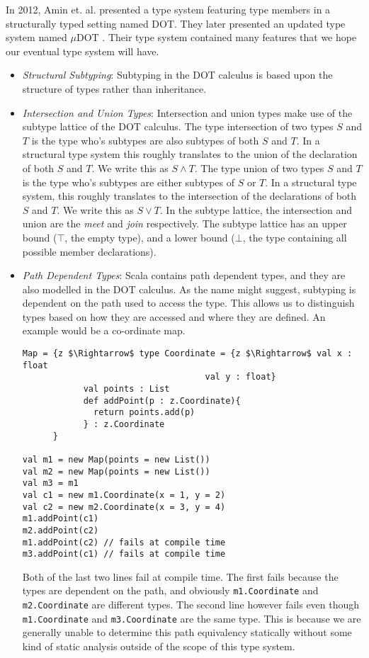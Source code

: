 \documentclass[11pt
              , a4paper
              , twoside
              , openright
              ]{report}
\numberwithin{case}{theorem}
\numberwithin{subcase}{case}
\begin{document}
In 2012, Amin et. al. \cite{amin:fool:2012} presented a type system featuring type members in a structurally typed setting named DOT. They later presented an updated type system named $\mu$DOT \cite{Amin:2014:FPT:2660193.2660216}. Their type system contained many features that we hope our eventual type system will have. 
\begin{itemize}
\item
\emph{Structural Subtyping}: Subtyping in the DOT calculus is based upon the structure of types rather than inheritance.
\item
\emph{Intersection and Union Types}: Intersection and union types \cite{Barbanera:1995:IUT:203538.203547, Pierce:1992:PIT:145640} make use of the subtype lattice of the DOT calculus. The type intersection of two types $S$ and $T$ is the type who's subtypes are also subtypes of both $S$ and $T$. In a structural type system this roughly translates to the union of the declaration of both $S$ and $T$. We write this as $S \wedge T$. The type union of two types $S$ and $T$ is the type who's subtypes are either subtypes of $S$ or $T$. In a structural type system, this roughly translates to the intersection of the declarations of both $S$ and $T$. We write this as $S \vee T$. In the subtype lattice, the intersection and union are the \emph{meet} and \emph{join} respectively. The subtype lattice has an upper bound ($\top$, the empty type), and a lower bound ($\bot$, the type containing all possible member declarations).
\item
\emph{Path Dependent Types}: Scala contains path dependent types, and they are also modelled in the DOT calculus. As the name might suggest, subtyping is dependent on the path used to access the type. This allows us to distinguish types based on how they are accessed and where they are defined. An example would be a co-ordinate map.
\begin{lstlisting}[mathescape, style=customlang]
Map = {z $\Rightarrow$ type Coordinate = {z $\Rightarrow$ val x : float
                                    val y : float}
            val points : List
            def addPoint(p : z.Coordinate){
              return points.add(p)
            } : z.Coordinate
      }

val m1 = new Map(points = new List())
val m2 = new Map(points = new List())
val m3 = m1
val c1 = new m1.Coordinate(x = 1, y = 2)
val c2 = new m2.Coordinate(x = 3, y = 4)
m1.addPoint(c1)
m2.addPoint(c2)
m1.addPoint(c2) // fails at compile time
m3.addPoint(c1) // fails at compile time
\end{lstlisting}
Both of the last two lines fail at compile time. The first fails because the types are dependent on the path, and obviously \verb|m1.Coordinate| and \verb|m2.Coordinate| are different types. The second line however fails even though \verb|m1.Coordinate| and \verb|m3.Coordinate| are the same type. This is because we are generally unable to determine this path equivalency statically without some kind of static analysis outside of the scope of this type system.

\end{itemize}
\end{document}
